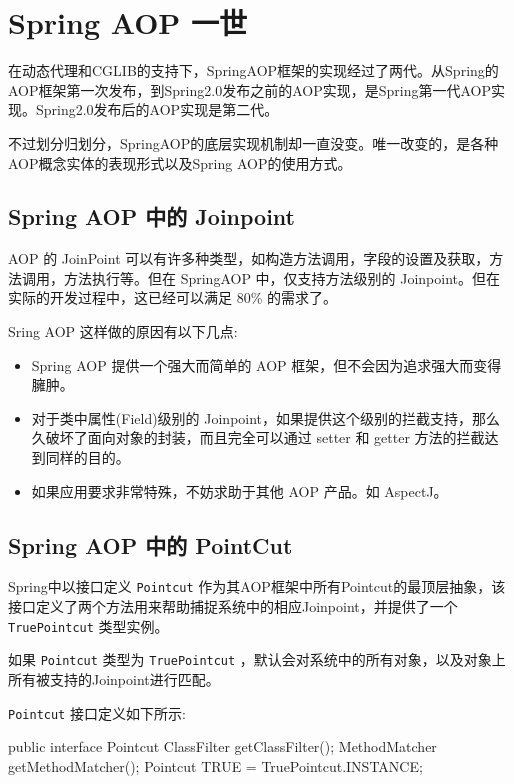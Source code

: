 \section{Spring AOP 一世}

在动态代理和CGLIB的支持下，SpringAOP框架的实现经过了两代。从Spring的AOP框架第一次发布，到Spring2.0发布之前的AOP实现，是Spring第一代AOP实现。Spring2.0发布后的AOP实现是第二代。

不过划分归划分，SpringAOP的底层实现机制却一直没变。唯一改变的，是各种AOP概念实体的表现形式以及Spring AOP的使用方式。

\subsection{Spring AOP 中的 Joinpoint}

AOP 的 JoinPoint 可以有许多种类型，如构造方法调用，字段的设置及获取，方法调用，方法执行等。但在 SpringAOP 中，仅支持方法级别的 Joinpoint。但在实际的开发过程中，这已经可以满足 80\% 的需求了。

Sring AOP 这样做的原因有以下几点:
\begin{itemize}
    \item Spring AOP 提供一个强大而简单的 AOP 框架，但不会因为追求强大而变得臃肿。
    \item 对于类中属性(Field)级别的 Joinpoint，如果提供这个级别的拦截支持，那么久破坏了面向对象的封装，而且完全可以通过 setter 和 getter 方法的拦截达到同样的目的。
    \item 如果应用要求非常特殊，不妨求助于其他 AOP 产品。如 AspectJ。
\end{itemize}

\subsection{Spring AOP 中的 PointCut}

Spring中以接口定义 \texttt{Pointcut} 作为其AOP框架中所有Pointcut的最顶层抽象，该接口定义了两个方法用来帮助捕捉系统中的相应Joinpoint，并提供了一个 \texttt{TruePointcut} 类型实例。

如果 \texttt{Pointcut} 类型为 \texttt{TruePointcut} ，默认会对系统中的所有对象，以及对象上所有被支持的Joinpoint进行匹配。

\texttt{Pointcut} 接口定义如下所示:

\begin{Java}
public interface Pointcut {
    ClassFilter getClassFilter();
    MethodMatcher getMethodMatcher();
    Pointcut TRUE = TruePointcut.INSTANCE;
}      
\end{Java}

